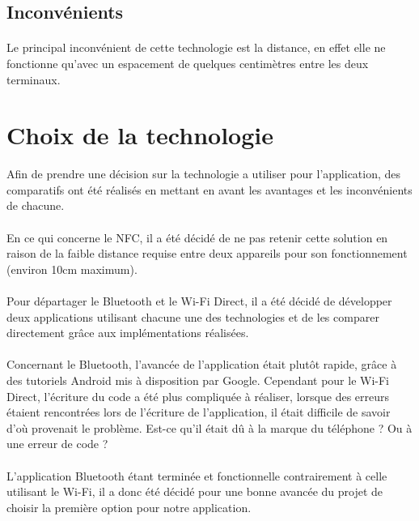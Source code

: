 \documentclass[a4paper,10pt]{report}
\begin{document}
    \subsection{Inconvénients}
    \paragraph{}
    Le principal inconvénient de cette technologie est la distance, en effet elle ne fonctionne qu'avec un espacement de quelques centimètres entre les deux terminaux.
  \section{Choix de la technologie}
  
  Afin de prendre une décision sur la technologie a utiliser pour l'application, des comparatifs ont été réalisés en mettant en avant les avantages et les inconvénients de chacune. 
  \paragraph{}
  En ce qui concerne le NFC, il a été décidé de ne pas retenir cette solution en raison de la faible distance requise entre deux appareils pour son fonctionnement (environ 10cm maximum).
  \paragraph{}
  Pour départager le Bluetooth et le Wi-Fi Direct, il a été décidé de développer deux applications utilisant chacune une des technologies et de les comparer directement grâce aux implémentations réalisées.
  \paragraph{}
  Concernant le Bluetooth, l'avancée de l'application était plutôt rapide, grâce à des tutoriels Android mis à disposition par Google. Cependant pour le Wi-Fi Direct, l'écriture du code a été plus compliquée à réaliser, lorsque des erreurs étaient rencontrées lors de l'écriture de l'application, il était difficile de savoir d'où provenait le problème. Est-ce qu'il était dû à la marque du téléphone ? Ou à une erreur de code ? 
  \paragraph{}
  L'application Bluetooth étant terminée et fonctionnelle contrairement à celle utilisant le Wi-Fi, il a donc été décidé pour une bonne avancée du projet de choisir la première option pour notre application.
  
\end{document}
